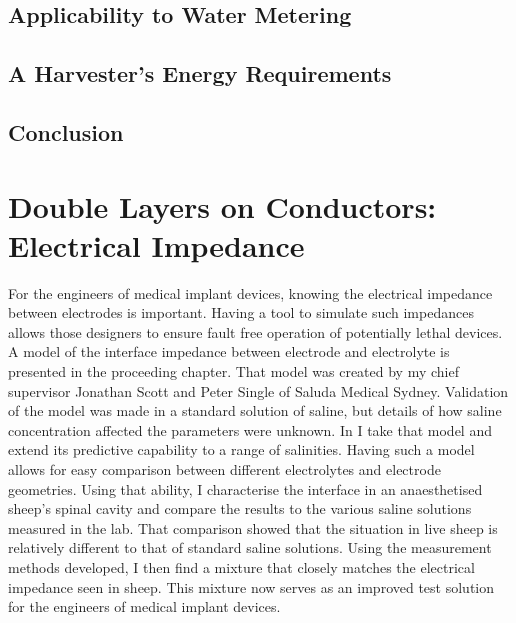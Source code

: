   \chapter{Applicability to Water Metering}
    \label{chap:part1_waterMetering}
    

  \chapter{A Harvester's Energy Requirements}
    \label{chap:part1_energyHarvestingRequirements}
    

  \chapter{Conclusion}
    \label{chap:part1_conclusion}
    



\part{Double Layers on Conductors: Electrical Impedance}
  \label{part:doubleLayersOnConductors}

  For the engineers of medical implant devices, knowing the electrical impedance between electrodes is important.
  Having a tool to simulate such impedances allows those designers to ensure fault free operation of potentially lethal devices.
  A model of the interface impedance between electrode and electrolyte is presented in the proceeding chapter.
  That model was created by my chief supervisor Jonathan Scott and Peter Single of Saluda Medical Sydney.
  Validation of the model was made in a standard solution of saline, but details of how saline concentration affected the parameters were unknown.
  In \cref{part:doubleLayersOnConductors} I take that model and extend its predictive capability to a range of salinities.
  Having such a model allows for easy comparison between different electrolytes and electrode geometries.
  Using that ability, I characterise the interface in an anaesthetised sheep's spinal cavity and compare the results to the various saline solutions measured in the lab.
  That comparison showed that the situation in live sheep is relatively different to that of standard saline solutions.
  Using the measurement methods developed, I then find a mixture that closely matches the electrical impedance seen in sheep.
  This mixture now serves as an improved test solution for the engineers of medical implant devices.



